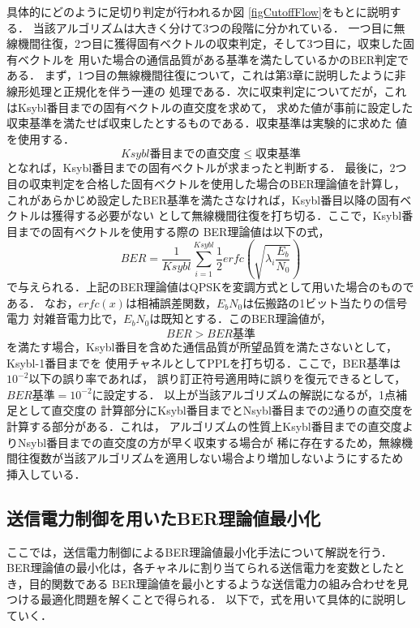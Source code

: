具体的にどのように足切り判定が行われるか図 \ref{figCutoffFlow}をもとに説明する．
当該アルゴリズムは大きく分けて3つの段階に分かれている．
一つ目に無線機間往復，2つ目に獲得固有ベクトルの収束判定，そして3つ目に，収束した固有ベクトルを
用いた場合の通信品質がある基準を満たしているかのBER判定である．
まず，1つ目の無線機間往復について，これは第3章に説明したように非線形処理と正規化を伴う一連の
処理である．次に収束判定についてだが，これはKsybl番目までの固有ベクトルの直交度を求めて，
求めた値が事前に設定した収束基準を満たせば収束したとするものである．収束基準は実験的に求めた
値を使用する．
\begin{equation}
    Ksybl番目までの直交度 \leq 収束基準
\end{equation}
となれば，Ksybl番目までの固有ベクトルが求まったと判断する．
最後に，2つ目の収束判定を合格した固有ベクトルを使用した場合のBER理論値を計算し，
これがあらかじめ設定したBER基準を満たさなければ，Ksybl番目以降の固有ベクトルは獲得する必要がない
として無線機間往復を打ち切る．ここで，Ksybl番目までの固有ベクトルを使用する際の
BER理論値は以下の式，
\begin{equation}
    BER = \frac{1}{Ksybl}\sum_{i=1}^{Ksybl} \frac{1}{2}erfc\left( \sqrt{\lambda_i\frac{E_b}{N_0}} \right)
\end{equation}
で与えられる．上記のBER理論値はQPSKを変調方式として用いた場合のものである．
 \cite{akaiwa}なお，$erfc(x)$は相補誤差関数，$E_bN_0$は伝搬路の1ビット当たりの信号電力
対雑音電力比で，$E_bN_0$は既知とする．このBER理論値が，
\begin{equation}
    BER > BER基準
\end{equation}
を満たす場合，Ksybl番目を含めた通信品質が所望品質を満たさないとして，Ksybl-1番目までを
使用チャネルとしてPPLを打ち切る．ここで，BER基準は$10^{-2}$以下の誤り率であれば，
誤り訂正符号適用時に誤りを復元できるとして，$BER基準=10^{-2}$に設定する．
以上が当該アルゴリズムの解説になるが，1点補足として直交度の
計算部分にKsybl番目までとNsybl番目までの2通りの直交度を計算する部分がある．これは，
アルゴリズムの性質上Ksybl番目までの直交度よりNsybl番目までの直交度の方が早く収束する場合が
稀に存在するため，無線機間往復数が当該アルゴリズムを適用しない場合より増加しないようにするため
挿入している．

\subsection{送信電力制御を用いたBER理論値最小化}
ここでは，送信電力制御によるBER理論値最小化手法について解説を行う．
BER理論値の最小化は，各チャネルに割り当てられる送信電力を変数としたとき，目的関数である
BER理論値を最小とするような送信電力の組み合わせを見つける最適化問題を解くことで得られる．
以下で，式を用いて具体的に説明していく．


